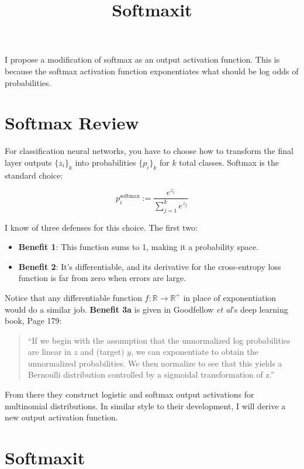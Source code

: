 \documentclass{article}
\title{Softmaxit}
\author{}
\date{}
\begin{document}
\maketitle

I propose a modification of softmax as an output activation function. This is because the softmax activation function exponentiates what should be log odds of probabilities.

\section{Softmax Review}
For classification neural networks, you have to choose how to transform the final layer outputs $\{z_i\}_k$ into probabilities $\{p_i\}_k$ for $k$ total classes. Softmax is the standard choice:

\begin{equation}
p_i^{\text{softmax}}:=\frac{e^{z_i}}{\sum_{j=1}^ke^{z_j}}
\end{equation}

I know of three defenses for this choice. The first two:
\begin{itemize}
\item[]\textbf{Benefit 1}: This function sums to 1, making it a probability space.
\item[]\textbf{Benefit 2}: It's differentiable, and its derivative for the cross-entropy loss function is far from zero when errors are large.
\end{itemize}

Notice that any differentiable function $f:\mathbb{R}\rightarrow\mathbb{R}^+$ in place of exponentiation would do a similar job. \textbf{Benefit 3a} is given in Goodfellow \textit{et al}'s deep learning book, Page 179: 

\begin{quote}
``If we begin with the assumption that the unnormalized log probabilities are linear in $z$ and (target) $y$, we can exponentiate to obtain the unnormalized probabilities. We then normalize to see that this yields a Bernoulli distribution controlled by a sigmoidal transformation of z.''
\end{quote}

From there they construct logistic and softmax output activations for multinomial distributions. In similar style to their development, I will derive a new output activation function.

\section{Softmaxit}
\end{document}
